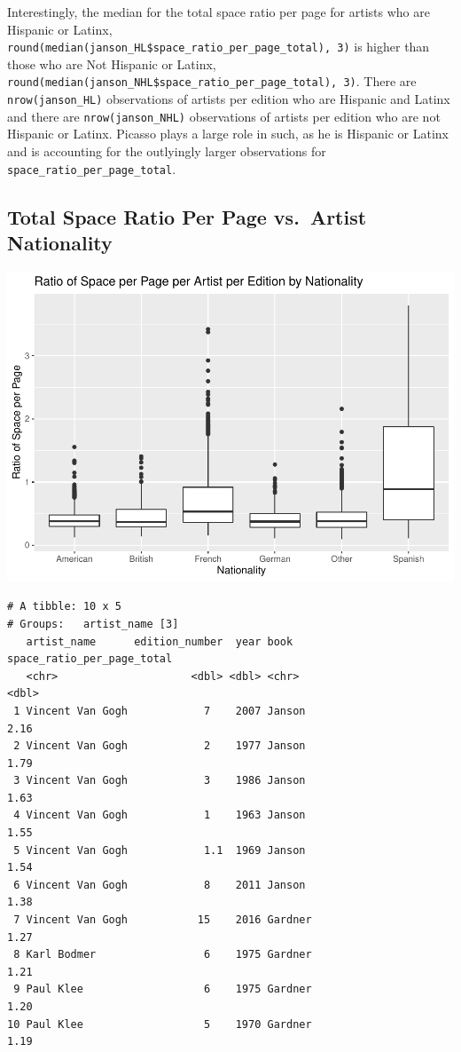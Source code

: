 \documentclass[
  letterpaper,
  DIV=11,
  numbers=noendperiod]{scrreprt}
\begin{document}
Interestingly, the median for the total space ratio per page for artists
who are Hispanic or Latinx,
\texttt{round(median(janson\_HL\$space\_ratio\_per\_page\_total),\ 3)}
is higher than those who are Not Hispanic or Latinx,
\texttt{round(median(janson\_NHL\$space\_ratio\_per\_page\_total),\ 3)}.
There are \texttt{nrow(janson\_HL)} observations of artists per edition
who are Hispanic and Latinx and there are \texttt{nrow(janson\_NHL)}
observations of artists per edition who are not Hispanic or Latinx.
Picasso plays a large role in such, as he is Hispanic or Latinx and is
accounting for the outlyingly larger observations for
\texttt{space\_ratio\_per\_page\_total}.

\hypertarget{total-space-ratio-per-page-vs.-artist-nationality}{%
\subsection{Total Space Ratio Per Page vs.~Artist
Nationality}\label{total-space-ratio-per-page-vs.-artist-nationality}}

\includegraphics{Chapter1/Chapter1_files/figure-pdf/nationalityotherallbooks-1.pdf}

\begin{verbatim}
# A tibble: 10 x 5
# Groups:   artist_name [3]
   artist_name      edition_number  year book    space_ratio_per_page_total
   <chr>                     <dbl> <dbl> <chr>                        <dbl>
 1 Vincent Van Gogh            7    2007 Janson                        2.16
 2 Vincent Van Gogh            2    1977 Janson                        1.79
 3 Vincent Van Gogh            3    1986 Janson                        1.63
 4 Vincent Van Gogh            1    1963 Janson                        1.55
 5 Vincent Van Gogh            1.1  1969 Janson                        1.54
 6 Vincent Van Gogh            8    2011 Janson                        1.38
 7 Vincent Van Gogh           15    2016 Gardner                       1.27
 8 Karl Bodmer                 6    1975 Gardner                       1.21
 9 Paul Klee                   6    1975 Gardner                       1.20
10 Paul Klee                   5    1970 Gardner                       1.19
\end{verbatim}
\end{document}
